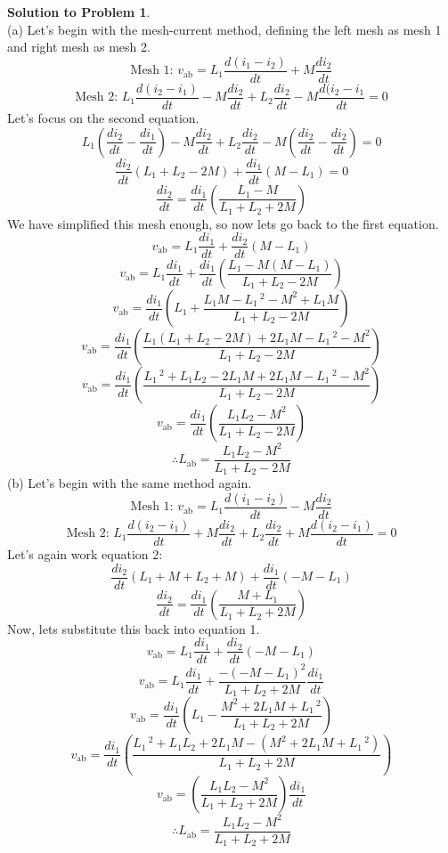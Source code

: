 \documentclass[11pt,letterpaper]{article}
\theoremstyle{definition}
\newtheorem{solprob}{\textcolor{solproblemcolor}{Solution to Problem}}  %
\begin{document}
\begin{solprob} \text{}\\
     (a) Let's begin with the mesh-current method, defining the left mesh as mesh 1 and right mesh as mesh 2.
     \[\text{Mesh 1: } v_\text{ab}=L_1\frac{d(i_1-i_2)}{dt}+M\frac{di_2}{dt}\]
     \[\text{Mesh 2: } L_1\frac{d(i_2-i_1)}{dt}-M\frac{di_2}{dt}+L_2\frac{di_2}{dt}-M\frac{d(i_2-i_1}{dt}=0\]
     Let's focus on the second equation.
     \[L_1(\frac{di_2}{dt}-\frac{di_1}{dt})-M\frac{di_2}{dt}+L_2\frac{di_2}{dt}-M(\frac{di_2}{dt}-\frac{di_2}{dt})=0\]
     \[\frac{di_2}{dt}(L_1+L_2-2M)+\frac{di_1}{dt}(M-L_1)=0\]
     \[\frac{di_2}{dt}=\frac{di_1}{dt}(\frac{L_1-M}{L_1+L_2+2M})\]
     We have simplified this mesh enough, so now lets go back to the first equation.
     \[v_\text{ab}=L_1\frac{di_1}{dt}+\frac{di_2}{dt}(M-L_1)\]
     \[v_\text{ab}=L_1\frac{di_1}{dt}+\frac{di_1}{dt}(\frac{L_1-M(M-L_1)}{L_1+L_2-2M})\]
     \[v_\text{ab}=\frac{di_1}{dt}(L_1+\frac{L_1M-L_1\,^2-M^2+L_1M}{L_1+L_2-2M})\]
     \[v_\text{ab}=\frac{di_1}{dt}(\frac{L_1(L_1+L_2-2M)+2L_1M-L_1\,^2-M^2}{L_1+L_2-2M})\]
     \[v_\text{ab}=\frac{di_1}{dt}(\frac{L_1\,^2+L_1L_2-2L_1M+2L_1M-L_1\,^2-M^2}{L_1+L_2-2M})\]
     \[v_\text{ab}=\frac{di_1}{dt}(\frac{L_1L_2-M^2}{L_1+L_2-2M})\]
     \[\therefore L_\text{ab}=\frac{L_1L_2-M^2}{L_1+L_2-2M}\]
     (b) Let's begin with the same method again.
     \[\text{Mesh 1: } v_\text{ab}=L_1\frac{d(i_1-i_2)}{dt}-M\frac{di_2}{dt}\]
     \[\text{Mesh 2: } L_1\frac{d(i_2-i_1)}{dt}+M\frac{di_2}{dt}+L_2\frac{di_2}{dt}+M\frac{d(i_2-i_1)}{dt}=0\]
     Let's again work equation 2:
     \[\frac{di_2}{dt}(L_1+M+L_2+M)+\frac{di_1}{dt}(-M-L_1)\]
     \[\frac{di_2}{dt}=\frac{di_1}{dt}(\frac{M+L_1}{L_1+L_2+2M})\]
     Now, lets substitute this back into equation 1.
     \[v_\text{ab}=L_1\frac{di_1}{dt}+\frac{di_2}{dt}(-M-L_1)\]
     \[v_\text{ab}=L_1\frac{di_1}{dt}+\frac{-(-M-L_1)^2}{L_1+L_2+2M}\frac{di_1}{dt}\]
     \[v_\text{ab}=\frac{di_1}{dt}(L_1-\frac{M^2+2L_1M+L_1\,^2}{L_1+L_2+2M})\]
     \[v_\text{ab}=\frac{di_1}{dt}(\frac{L_1\,^2+L_1L_2+2L_1M-(M^2+2L_1M+L_1\,^2)}{L_1+L_2+2M})\]
     \[v_\text{ab}=(\frac{L_1L_2-M^2}{L_1+L_2+2M})\frac{di_1}{dt}\]
     \[\therefore L_\text{ab}=\frac{L_1L_2-M^2}{L_1+L_2+2M}\]
\end{solprob}

\noindent\makebox[\linewidth]{\color{rouge_poly}{\rule{\textwidth}{1.3pt}}}	
\end{document}
